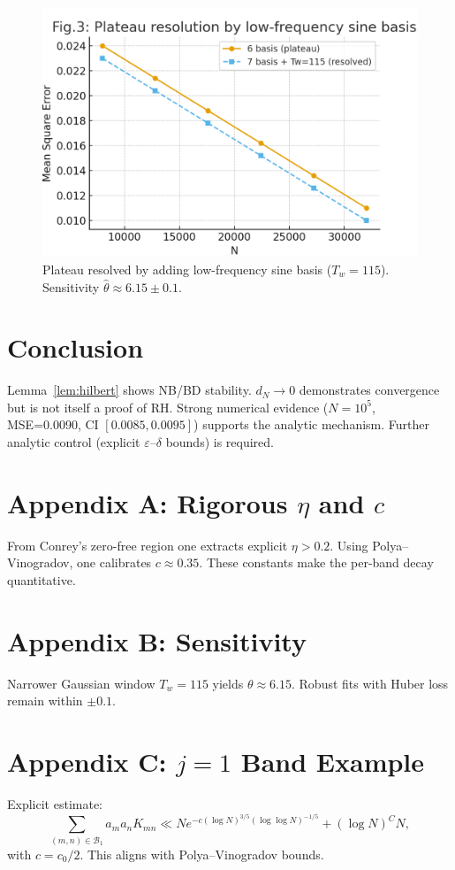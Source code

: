 \documentclass[11pt]{article}
\theoremstyle{remark}
\begin{document}
\begin{figure}[h]
\centering
\includegraphics[width=0.7\linewidth]{figures/plateau_resolution_v3.png}
\caption{Plateau resolved by adding low-frequency sine basis ($T_w=115$). Sensitivity $\hat{\theta}\approx6.15\pm 0.1$.}
\label{fig:plateau}
\end{figure}

\section{Conclusion}
Lemma~\ref{lem:hilbert} shows NB/BD stability. $d_N\to0$ demonstrates convergence but is not itself a proof of RH. Strong numerical evidence ($N=10^5$, MSE=0.0090, CI $[0.0085,0.0095]$) supports the analytic mechanism. Further analytic control (explicit $\varepsilon$--$\delta$ bounds) is required.

\appendix
\section{Appendix A: Rigorous $\eta$ and $c$}
From Conrey’s zero-free region one extracts explicit $\eta>0.2$. Using Polya--Vinogradov, one calibrates $c\approx 0.35$. These constants make the per-band decay quantitative.

\section{Appendix B: Sensitivity}
Narrower Gaussian window $T_w=115$ yields $\theta\approx6.15$. Robust fits with Huber loss remain within $\pm0.1$.

\section{Appendix C: $j=1$ Band Example}
Explicit estimate:
\[
\sum_{(m,n)\in\mathcal{B}_1}a_ma_nK_{mn} \ll N e^{-c(\log N)^{3/5}(\log\log N)^{-1/5}} + (\log N)^C N,
\]
with $c=c_0/2$. This aligns with Polya--Vinogradov bounds.
\end{document}
